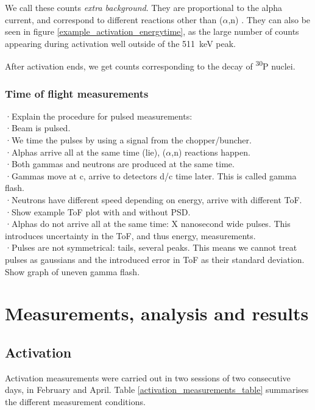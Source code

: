 \documentclass[a4paper,12pt]{report}
\newcommand{\an}{($\alpha$,n) }
\newcommand{\Piso}{\textsuperscript{30}P }
\begin{document}
We call these counts \textit{extra background}.
They are proportional to the alpha current, and correspond to different reactions other than \an.
They can also be seen in figure \ref{example_activation_energytime}, as the large number of counts appearing during activation well outside of the \qty{511}{\keV} peak.

After activation ends, we get counts corresponding to the decay of \Piso nuclei.

\subsection{Time of flight measurements}
·Explain the procedure for pulsed measurements:\\
·Beam is pulsed.\\
·We time the pulses by using a signal from the chopper/buncher.\\	%
·Alphas arrive all at the same time (lie), \an reactions happen.\\
·Both gammas and neutrons are produced at the same time.\\	%
·Gammas move at c, arrive to detectors d/c time later. This is called gamma flash.\\
·Neutrons have different speed depending on energy, arrive with different ToF.\\
·Show example ToF plot with and without PSD.\\

·Alphas do not arrive all at the same time: X nanosecond wide pulses. This introduces uncertainty in the ToF, and thus energy, measurements.\\
·Pulses are not symmetrical: tails, several peaks. This means we cannot treat pulses as gaussians and the introduced error in ToF as their standard deviation. Show graph of uneven gamma flash.\\


\chapter{Measurements, analysis and results}

\section{Activation}
Activation measurements were carried out in two sessions of two consecutive days, in February and April.
Table \ref{activation_measurements_table} summarises the different measurement conditions.
\end{document}
